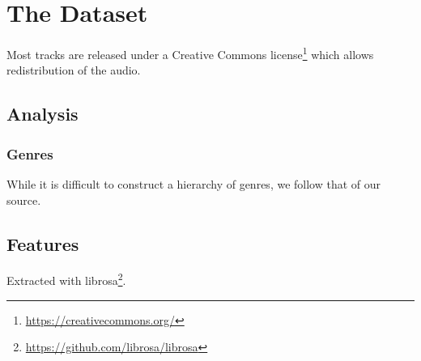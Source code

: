 \documentclass{article}
\begin{document}



\section{The Dataset} %



Most tracks are released under a Creative Commons license\footnote{\url{https://creativecommons.org/}} which allows redistribution of the audio.

\subsection{Analysis}

\subsubsection{Genres}

While it is difficult to construct a hierarchy of genres, we follow that of our source.

\subsection{Features} %

Extracted with librosa\footnote{\url{https://github.com/librosa/librosa}}.
\end{document}
